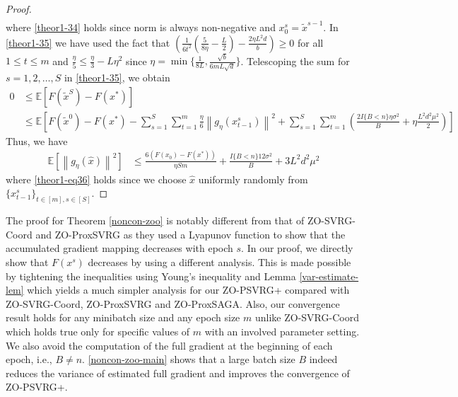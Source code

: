 \documentclass{article}
\newcommand*{\E}{\mathbb{E}}
\newcommand{\norm}[1]{\left\lVert#1\right\rVert}
\theoremstyle{definition}
\theoremstyle{remark}
\begin{document}
\begin{proof}
\begin{align}
 \end{align}
 where \eqref{theor1-34} holds since norm is always non-negative and $x_0^s = \tilde{x}^{s-1}$. In \eqref{theor1-35} we have used the fact that $(\frac{1}{6t^2}(\frac{5}{8\eta} - \frac{L}{2})-\frac{2\eta L^2 d}{b})\geq 0$ for all $1\leq t \leq m$ and $\frac{\eta}{5} \leq \frac{\eta}{3}-L\eta^2$ since $\eta = \min\{\frac{1}{8L}, \frac{\sqrt{b}}{6mL\sqrt{d}}\}$. 
 Telescoping the sum for $s = 1, 2, \ldots, S$ in \eqref{theor1-35}, we obtain
 \begin{equation*}
\begin{split} 
0 &\leq \E[F(\tilde{x}^S) - F({x}^*)] \\
&\leq \E\left[F(\tilde{x}^{0}) - F({x}^*) - \sum_{s=1}^S\sum_{t=1}^m\frac{\eta}{6}\norm{g_{\eta}(x_{t-1}^s)}^2 + \sum_{s=1}^S\sum_{t=1}^m(\frac{2I\{B < n\}\eta \sigma ^2}{B}+\eta \frac{L^2 d^2 \mu^2}{2})\right]
 \end{split}
 \end{equation*}
 Thus, we have
  \begin{align}
\E[\norm{g_{\eta}(\hat{x})}^2] & \leq \frac{6\left(F(x_0) - F({x}^*)\right)}{\eta Sm} + \frac{I\{B < n\}12\sigma ^2}{B}+3{L^2 d^2 \mu^2}\label{theor1-eq36}
 \end{align}
 where \eqref{theor1-eq36} holds since we choose  $\hat{x}$ uniformly randomly from $\{x_{t-1}^s\}_{t\in [m], s\in [S]}$. 
\end{proof} 
{\color{Violet}
The proof for Theorem \ref{noncon-zoo} is notably different from that of ZO-SVRG-Coord and ZO-ProxSVRG \cite{} as they used a Lyapunov function to show that the accumulated gradient mapping decreases with epoch $s$. In our proof, we directly show that $F(x^s)$ decreases by  using a different analysis. This is made possible by tightening the inequalities using Young's inequality and Lemma \ref{var-estimate-lem} which yields a much simpler analysis for our ZO-PSVRG+ compared with ZO-SVRG-Coord, ZO-ProxSVRG and ZO-ProxSAGA.  Also, our convergence result holds for any minibatch size and any epoch size $m$ unlike ZO-SVRG-Coord which holds true only for specific values of $m$ with an involved parameter setting.
We also avoid the computation of the full gradient at the beginning of each epoch, i.e., $B \neq n$.
} \eqref{noncon-zoo-main} shows that a large batch size $B$ indeed reduces the variance of estimated full gradient and improves the convergence of ZO-PSVRG+.
 
\end{document}
